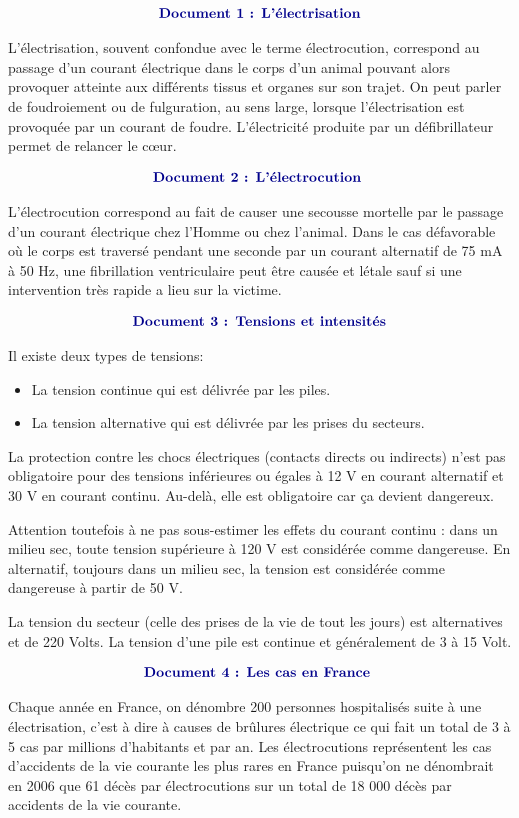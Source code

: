 \documentclass[10pt]{article}
\newcommand{\doctitle}[1]{ 
\begin{align*}
	\centering\textbf{\color{DarkBlue} {#1}}
\end{align*}	
}
\newcommand{\docOne}{ 
	\large
	\doctitle{Document 1 : L'électrisation}

		L'électrisation, souvent confondue avec le terme électrocution, correspond au passage d'un courant
		électrique dans le corps d'un animal pouvant alors provoquer atteinte aux différents
		tissus et organes sur son trajet.
		On peut parler de foudroiement ou de fulguration, au sens large, lorsque l'électrisation est
		provoquée par un courant de foudre. L'électricité produite par un défibrillateur permet de relancer le cœur.
		}
\newcommand{\docTwo}{ 
	\large
	\doctitle{Document 2 : L'électrocution }  
		
	L'électrocution correspond au fait de causer une secousse mortelle par le passage d'un courant
	électrique chez l'Homme ou chez l'animal. Dans le cas défavorable où le corps est traversé pendant
	une seconde par un courant alternatif de 75 mA à 50  Hz, une fibrillation ventriculaire peut
	être causée et létale sauf si une intervention très rapide a lieu sur la victime.
}
\newcommand{\docFour}{
	\large
	\doctitle{Document 4 : Les cas en France } 
		
		Chaque année en France, on dénombre 200 personnes hospitalisés suite à une électrisation, c'est à
		dire à causes de brûlures électrique ce qui fait un total de 3 à 5 cas par millions d'habitants et par
		an.
		Les électrocutions représentent les cas d'accidents de la vie courante les plus rares en France
		puisqu'on ne dénombrait en 2006 que 61 décès par électrocutions sur un total de 18 000 décès par
		accidents de la vie courante.
}
\newcommand{\docThree}{
	\large
	\doctitle{Document 3 : Tensions et intensités}

	Il existe deux types de tensions: 
	\begin{itemize}
		\item La tension continue qui est délivrée par les piles.
		\item La tension alternative qui est délivrée par les prises du secteurs.
	\end{itemize}
	La protection contre les chocs électriques (contacts directs ou indirects) n'est pas obligatoire pour
	des tensions inférieures ou égales à 12 V en courant alternatif et 30 V en courant continu. Au-delà,
	elle est obligatoire car ça devient dangereux.

	Attention toutefois à ne pas sous-estimer les effets du courant continu : dans un
	milieu sec, toute tension supérieure à 120 V est considérée comme dangereuse.
	En alternatif, toujours dans un milieu sec, la tension est considérée comme dangereuse à partir de
	50 V.

	La tension du secteur (celle des prises de la vie de tout les jours) est alternatives et de 220 Volts.
	La tension d'une pile est continue et généralement de 3 à 15 Volt.
}
\begin{document}
		\begin{minipage}[t]{0.45\textwidth}
			\docOne
		\end{minipage}
		\hspace{10pt}
		\begin{minipage}[t]{0.45\textwidth}
			\docTwo
		\end{minipage}	

\begin{minipage}[t]{0.45\textwidth}
	\docThree
\end{minipage}
\hspace{10pt}
\begin{minipage}[t]{0.45\textwidth}
	\docFour 
\end{minipage}
\end{document}
